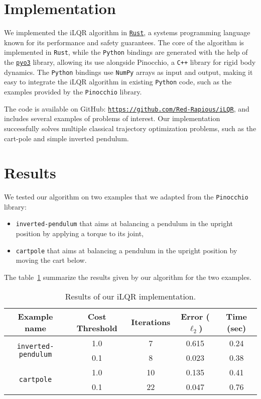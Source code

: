 \documentclass[nodate]{../cs-classes/cs-classes}
\begin{document}
\section{Implementation}
We implemented the iLQR algorithm in \href{https://www.rust-lang.org/}{\texttt{Rust}}, a systems programming language known for its performance and safety guarantees. The core of the algorithm is implemented in \texttt{Rust}, while the \texttt{Python} bindings are generated with the help of the \href{https://pyo3.rs/v0.23.3/}{\texttt{pyo3}} library, allowing its use alongside Pinocchio, a \texttt{C++} library for rigid body dynamics. The \texttt{Python} bindings use \texttt{NumPy} arrays as input and output, making it easy to integrate the iLQR algorithm in existing \texttt{Python} code, such as the examples provided by the \texttt{Pinocchio} library.

The code is available on GitHub: \href{https://github.com/Red-Rapious/iLQR}{\texttt{https://github.com/Red-Rapious/iLQR}}, and includes several examples of problems of interest. Our implementation successfully solves multiple classical trajectory optimization problems, such as the cart-pole and simple inverted pendulum.

\section{Results}

We tested our algorithm on two examples that we adapted from the \texttt{Pinocchio} library:
\begin{itemize}
    \item \texttt{inverted-pendulum} that aims at balancing a pendulum in the upright position by applying a torque to its joint,
    \item \texttt{cartpole} that aims at balancing a pendulum in the upright position by moving the cart below.
\end{itemize}
The table~\ref{table:perf} summarize the results given by our algorithm for the two examples.

\begin{table}[htbp]
    \centering
    \begin{tabular}{ccccc}
        \toprule
        Example name                                & Cost Threshold & Iterations & Error ($\ell_2$) & Time (sec) \\
        \midrule
        \multirow{2}{*}{\texttt{inverted-pendulum}} & 1.0            & 7          & 0.615            & 0.24       \\
                                                    & 0.1            & 8          & 0.023            & 0.38       \\
        \multirow{2}{*}{\texttt{cartpole}}          & 1.0            & 10         & 0.135            & 0.41       \\
                                                    & 0.1            & 22         & 0.047            & 0.76       \\
        \bottomrule
    \end{tabular}
    \caption{Results of our iLQR implementation.}
    \label{table:perf}
\end{table}
\end{document}
